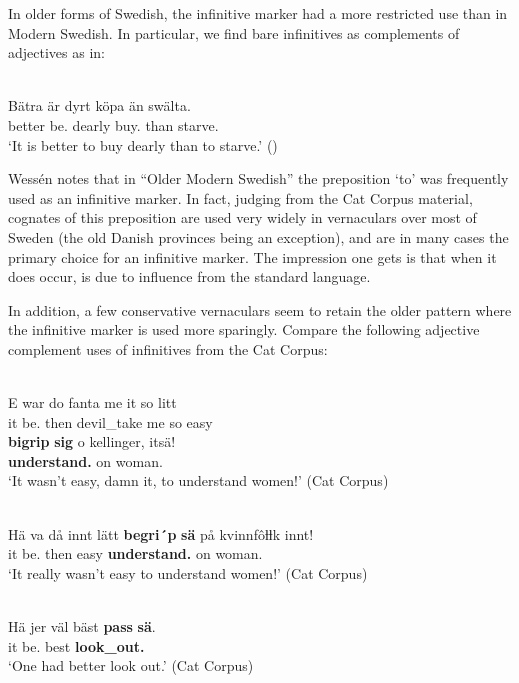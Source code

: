 In older forms of Swedish, the infinitive marker had a more restricted use than in Modern Swedish. In particular, we find bare infinitives as complements of adjectives as in:

\ea\label{}
\\
\gll Bätra  är  dyrt  köpa  än  swälta.  \\
better  be.{\prs}  dearly  buy.{\inf}  than  starve.{\inf}  \\
\glt ‘It is better to buy dearly than to starve.’ (\citealt[138]{Wessén1956})
\z

Wessén notes that in “Older Modern Swedish” the preposition  ‘to’ was frequently used as an infinitive marker. In fact, judging from the Cat Corpus material, cognates of this preposition are used very widely in vernaculars over most of Sweden (the old Danish provinces being an exception), and are in many cases the primary choice for an infinitive marker. The impression one gets is that when it does occur, is due to influence from the standard language. 

In addition, a few conservative vernaculars seem to retain the older pattern where the infinitive marker is used more sparingly. Compare the following adjective complement uses of infinitives from the Cat Corpus:

\ea\label{}
\\
\gll E  war  do  fanta  me  it  so  litt\\
it  be.{\pst}  then  devil\_take  me  {\neg}  so  easy\\
\gll \textbf{bigrip} \textbf{sig} o  kellinger,  itsä!\\
\textbf{understand.{\inf}} \textbf{{}} on  woman.{\pl}  {\neg}\\
\glt  ‘It wasn’t easy, damn it, to understand women!’ (Cat Corpus)
\z

\ea\label{}
\\
\gll Hä  va  då  innt  lätt  \textbf{begri´p} \textbf{sä} på  kvinnfôƚƚk  innt!\\
it  be.{\pst}  then  {\neg}  easy  \textbf{understand.{\inf}} \textbf{{}} on  woman.{\pl}  {\neg}\\
\glt ‘It really wasn’t easy to understand women!’ (Cat Corpus)
\z

\ea\label{}
\\
\gll Hä  jer  väl  bäst  \textbf{pass} \textbf{sä}.\\
it  be.{\prs}  {\prag}  best  \textbf{look\_out.{\inf}} \textbf{{}}\\
\glt ‘One had better look out.’ (Cat Corpus)
\z

